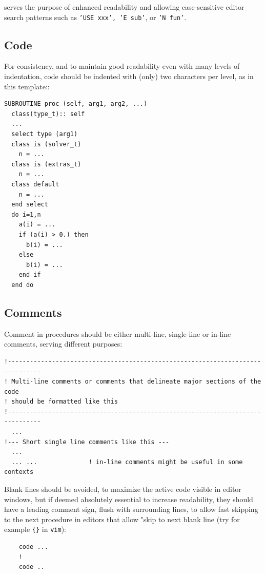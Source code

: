 \documentclass[paper=a4,fontsize=11pt]{scrartcl}
\numberwithin{equation}{section}		%
\numberwithin{figure}{section}			%
\numberwithin{table}{section}				%
\newcommand{\codecolor}{\color{Blue}}
\newcommand{\cmdcolor}{\color{ForestGreen}}
\newcommand{\Code}[1]{{\codecolor\texttt{#1}}}
\newcommand{\Cmd}[1]{{\cmdcolor\texttt{#1}}}
\begin{document}
serves the purpose of enhanced readability and allowing case-sensitive editor search patterns such as \Code{'USE xxx', 'E sub'}, or \Code{'N fun'}.

\subsection{Code}
For consistency, and to maintain good readability even with many levels of indentation, code should be indented with (only) two characters per level, as in this template::

{\codecolor\begin{verbatim}
SUBROUTINE proc (self, arg1, arg2, ...)
  class(type_t):: self
  ...
  select type (arg1)
  class is (solver_t)
    n = ...
  class is (extras_t)
    n = ...
  class default
    n = ...
  end select
  do i=1,n
    a(i) = ...
    if (a(i) > 0.) then
      b(i) = ...
    else
      b(i) = ...
    end if
  end do
\end{verbatim}}


\subsection{Comments}
Comment in procedures should be either multi-line, single-line or in-line comments, serving different purposes:

{\codecolor\begin{verbatim}
!-------------------------------------------------------------------------------
! Multi-line comments or comments that delineate major sections of the code
! should be formatted like this
!-------------------------------------------------------------------------------
  ...
!--- Short single line comments like this ---
  ...
  ... ...              ! in-line comments might be useful in some contexts
\end{verbatim}}

Blank lines should be avoided, to maximize the active code visible in editor windows, but if deemed absolutely essential to increase readability, they should have a leading comment sign, flush with surrounding lines, to allow fast skipping to the next procedure in editors that allow "skip to next blank line (try for example \Code{\{\}} in \Cmd{vim}):

{\codecolor\begin{verbatim}
    code ...
    !
    code ..
\end{verbatim}}


\end{document}
